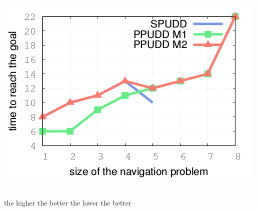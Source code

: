 \documentclass[12pt,svgnames,table]{beamer}
\begin{document}
\begin{frame}
{\begin{minipage}{0.45\linewidth}
 \\
\includegraphics[scale=0.4]{courbePerfMDP2.png} 
\end{minipage}\\
\vspace{0.3cm} 
\hspace{1.2cm} {\color{gggreen} the higher the better} \hspace{1.4cm} {\color{gggreen} the lower the better}
}
\end{frame}
\end{document}
